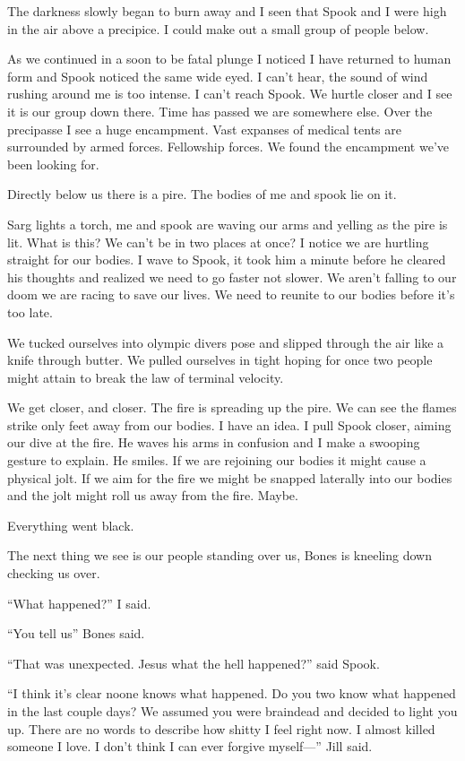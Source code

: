 \lettrine[lines=2,lraise=0]{T}\space he darkness slowly began to burn away and I seen that Spook and I were high in the air above a precipice. I could make out a small group of people below.

As we continued in a soon to be fatal plunge I noticed I have returned to human form and Spook noticed the same wide eyed. I can't hear, the sound of wind rushing around me is too intense. I can't reach Spook. We hurtle closer and I see it is our group down there. Time has passed we are somewhere else. Over the precipasse I see a huge encampment. Vast expanses of medical tents are surrounded by armed forces. Fellowship forces. We found the encampment we've been looking for.

Directly below us there is a pire. The bodies of me and spook lie on it.

Sarg lights a torch, me and spook are waving our arms and yelling as the pire is lit. What is this? We can't be in two places at once? I notice we are hurtling straight for our bodies. I wave to Spook, it took him a minute before he cleared his thoughts and realized we need to go faster not slower. We aren't falling to our doom we are racing to save our lives. We need to reunite to our bodies before it's too late.

We tucked ourselves into olympic divers pose and slipped through the air like a knife through butter. We pulled ourselves in tight hoping for once two people might attain to break the law of terminal velocity.

We get closer, and closer. The fire is spreading up the pire. We can see the flames strike only feet away from our bodies. I have an idea. I pull Spook closer, aiming our dive at the fire. He waves his arms in confusion and I make a swooping gesture to explain. He smiles. If we are rejoining our bodies it might cause a physical jolt. If we aim for the fire we might be snapped laterally into our bodies and the jolt might roll us away from the fire. Maybe.

Everything went black.

The next thing we see is our people standing over us, Bones is kneeling down checking us over.

``What happened?'' I said.

``You tell us'' Bones said.

``That was unexpected. Jesus what the hell happened?'' said Spook.

``I think it's clear noone knows what happened. Do you two know what happened in the last couple days? We assumed you were braindead and decided to light you up. There are no words to describe how shitty I feel right now. I almost killed someone I love. I don't think I can ever forgive myself---'' Jill said.


